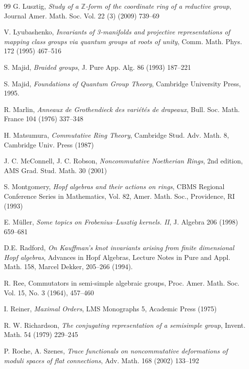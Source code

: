 \documentclass[11pt]{amsart}
\begin{document}
\begin{thebibliography}{99}
 G. Lusztig, {\it Study of a $\mathbb{Z}$-form of the coordinate ring of a reductive group}, Journal Amer. Math. Soc. Vol. 22 (3) (2009) 739--69

 V. Lyubashenko, {\it Invariants of 3-manifolds and projective representations of mapping class groups via quantum groups at roots of unity}, Comm. Math. Phys. 172 (1995) 467--516 

 S. Majid, {\it Braided groups}, J. Pure App. Alg. 86 (1993) 187--221

 S. Majid, {\em Foundations of Quantum Group Theory}, Cambridge University Press, 1995.

 R. Marlin, {\it Anneaux de Grothendieck des vari\'et\'es de drapeaux}, Bull. Soc. Math. France 104 (1976) 337--348

 H. Matsumura, {\it Commutative Ring Theory}, Cambridge Stud. Adv. Math. 8, Cambridge Univ. Press (1987) 

 J. C. McConnell, J. C. Robson, {\it Noncommutative Noetherian Rings}, 2nd edition, AMS Grad. Stud. Math. 30 (2001) 

 S. Montgomery, {\it Hopf algebras and their actions on rings}, CBMS Regional Conference Series in Mathematics, Vol. 82, Amer. Math. Soc., Providence, RI (1993)


 E. M\"uller, {\it Some topics on Frobenius--Lusztig kernels. II}, J. Algebra 206 (1998) 659–681

 D.E. Radford, {\em On Kauffman’s knot invariants arising from finite dimensional Hopf algebras}, Advances in Hopf Algebras, Lecture Notes in Pure and Appl. Math. 158, Marcel Dekker, 205--266 (1994).

 R. Ree, {Commutators in semi-simple algebraic groups}, Proc. Amer. Math. Soc. Vol. 15, No. 3 (1964), 457--460 

 I. Reiner, {\it Maximal Orders}, LMS Monographs 5, Academic Press (1975)

 R. W. Richardson, {\it The conjugating representation of a semisimple group}, Invent. Math. 54 (1979) 229--245

 P. Roche, A. Szenes, \emph{Trace functionals on noncommutative deformations of moduli spaces of flat connections}, Adv. Math. 168 (2002) 133--192


\end{thebibliography}
\end{document}
